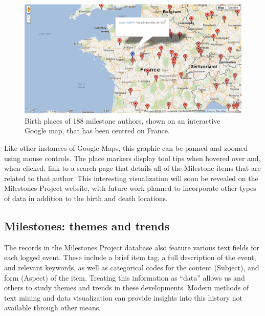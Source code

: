 \begin{figure}[!htb]
  \centering
  \includegraphics[width=\textwidth,clip]{fig/authormap}
  \caption{Birth places of 188 milestone authors, shown on an interactive Google map, that has been centred on France.}
  \label{fig:authormap}
\end{figure}

Like other instances of Google Maps, this graphic can be panned and zoomed using mouse controls. The place markers display tool tips when hovered over and, when clicked, link to a search page that details all of the Milestone items that are related to that author. This interesting visualization will soon be revealed on the Milestones Project website, with future work planned to incorporate other types of data in addition to the birth and death locations.

\subsection{Milestones: themes and trends}\label{sec:themes}
The records in the Milestones Project database also feature various text fields for each logged event. These include a brief item tag, a full description of the event, and relevant keywords, as well as categorical codes for the content (Subject), and form  (Aspect) of the item. Treating this information as ``data'' allows us and others to study themes and trends in these developments.  Modern methods of text mining and data visualization can provide insights into this history not available through other means.

